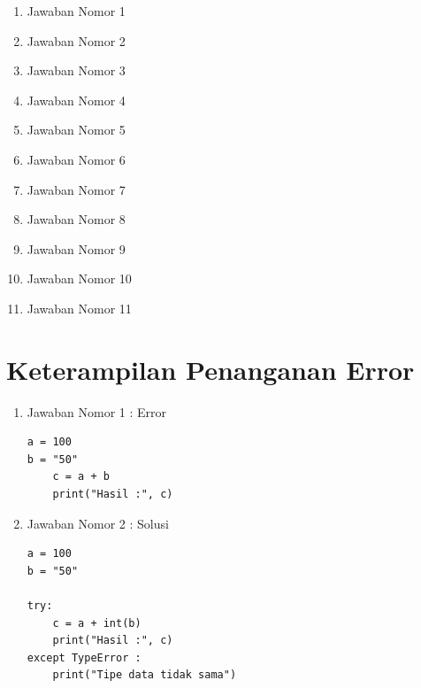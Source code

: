 \begin{enumerate}
\item Jawaban Nomor 1


\item Jawaban Nomor 2


\item Jawaban Nomor 3


\item Jawaban Nomor 4


\item Jawaban Nomor 5


\item Jawaban Nomor 6


\item Jawaban Nomor 7


\item Jawaban Nomor 8


\item Jawaban Nomor 9


\item Jawaban Nomor 10


\item Jawaban Nomor 11

\end{enumerate}

\section{Keterampilan Penanganan Error}
\begin{enumerate}
\item Jawaban Nomor 1  : Error
\begin{verbatim}
a = 100
b = "50"
    c = a + b
    print("Hasil :", c)
\end{verbatim}

\item Jawaban Nomor 2 : Solusi
\begin{verbatim}
a = 100
b = "50"

try:
    c = a + int(b)
    print("Hasil :", c)
except TypeError :
    print("Tipe data tidak sama") 
\end{verbatim}

\end{enumerate}


